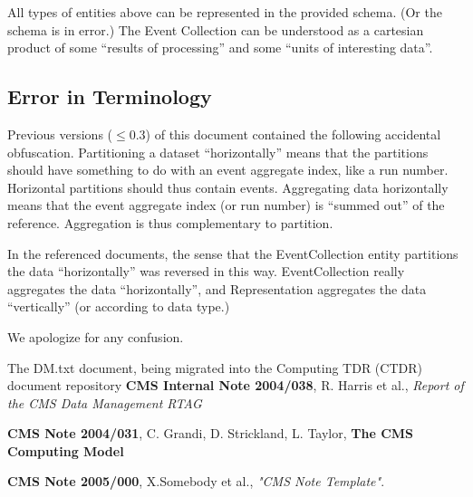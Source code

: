\documentclass{cmspaper}
\begin{document}
All types of entities above can be represented in the provided schema.  (Or the schema
is in error.)  The Event Collection can be understood as a cartesian product of some
``results of processing'' and some ``units of interesting data''.  

\subsection{Error in Terminology}

Previous versions ($\le 0.3$) of this document contained the following accidental obfuscation.  
Partitioning a dataset ``horizontally'' means that the partitions should have something 
to do with an event aggregate index, like a run number.  Horizontal partitions should 
thus contain events.  Aggregating data horizontally means that the 
event aggregate index (or run number) is ``summed out'' of the reference.  Aggregation 
is thus complementary to partition.  

In the referenced documents, the sense that the EventCollection entity 
partitions the data ``horizontally'' was reversed in this way.  EventCollection really 
aggregates the data ``horizontally'', and Representation aggregates the data ``vertically''
(or according to data type.)  

We apologize for any confusion.


\begin{thebibliography}{9}
   The DM.txt document, being migrated into the Computing
      TDR (CTDR) document repository
   {\bf CMS Internal Note 2004/038}, R. Harris et al., 
    {\it Report of the CMS Data Management RTAG}

   {\bf CMS Note 2004/031}, C. Grandi, D. Strickland,
               L. Taylor, {\bf The CMS Computing Model}

   {\bf CMS Note 2005/000},
    X.Somebody et al.,
    {\em "CMS Note Template"}.
\end{thebibliography}
 
\pagebreak
\end{document}
